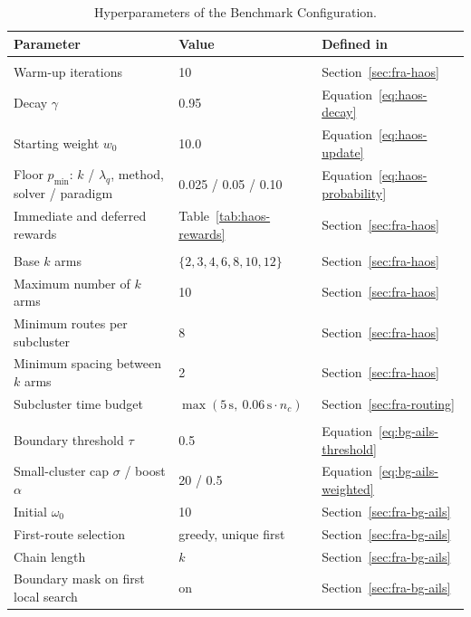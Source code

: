\begin{table}[!htb]
\centering\small
\caption{Hyperparameters of the Benchmark Configuration.}
\label{tab:hyperparameters}
\ifdefined\hypdefinedcol\else\newlength{\hypdefinedcol}\fi
{}%
\addtolength{\hypdefinedcol}{1.2em}%
\begin{tabularx}{\linewidth}{@{}
  >{\raggedright\arraybackslash}X
  l
  w{l}{\hypdefinedcol}
@{}}
\toprule
Parameter & Value & Defined in \\
\midrule
{} \\
Warm-up iterations & 10 & Section~\ref{sec:fra-haos} \\
Decay $\gamma$ & 0.95 & Equation~\ref{eq:haos-decay} \\
Starting weight $w_0$ & 10.0 & Equation~\ref{eq:haos-update} \\
Floor $p_{\min}$: $k$ / $\lambda_q$, method, solver / paradigm & 0.025 / 0.05 / 0.10 & Equation~\ref{eq:haos-probability} \\
Immediate and deferred rewards & Table~\ref{tab:haos-rewards} & Section~\ref{sec:fra-haos} \\
\addlinespace
{} \\
Base $k$ arms & $\{2,3,4,6,8,10,12\}$ & Section~\ref{sec:fra-haos} \\
Maximum number of $k$ arms & 10 & Section~\ref{sec:fra-haos} \\
Minimum routes per subcluster & 8 & Section~\ref{sec:fra-haos} \\
Minimum spacing between $k$ arms & 2 & Section~\ref{sec:fra-haos} \\
Subcluster time budget & $\max(5\,\mathrm{s},\ 0.06\,\mathrm{s} \cdot n_c)$ & Section~\ref{sec:fra-routing} \\
\addlinespace
{} \\
Boundary threshold $\tau$ & 0.5 & Equation~\ref{eq:bg-ails-threshold} \\
Small-cluster cap $\sigma$ / boost $\alpha$ & 20 / 0.5 & Equation~\ref{eq:bg-ails-weighted} \\
Initial $\omega_0$ & 10 & Section~\ref{sec:fra-bg-ails} \\
First-route selection & greedy, unique first & Section~\ref{sec:fra-bg-ails} \\
Chain length & $k$ & Section~\ref{sec:fra-bg-ails} \\
Boundary mask on first local search & on & Section~\ref{sec:fra-bg-ails} \\

\end{tabularx}
\end{table}
